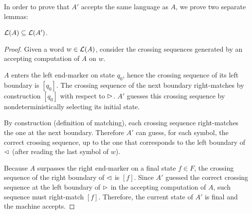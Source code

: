 In order to prove that $A'$ accepts the same language as $A$, we prove two separate lemmas:
\begin{lemm}\label{lem:2DFAto1NFA-1}
	$\mathcal L(A)\subseteq\mathcal L(A')$.
\end{lemm}
\begin{proof}
	Given a word $w\in\mathcal L(A)$, consider the crossing sequences generated by an accepting computation of $A$ on $w$.

	$A$ enters the left end-marker on state $q_0$, hence the crossing sequence of its left boundary is $[q_0]$.
	The crossing sequence of the next boundary right-matches by construction $[q_0]$ with respect to $\rhd$.
	$A'$ guesses this crossing sequence by nondeterministically selecting its initial state.

	By construction (definition of matching), each crossing sequence right-matches the one at the next boundary.
	Therefore $A'$ can guess, for each symbol, the correct crossing sequence, up to the one that corresponds to the left boundary of $\lhd$ (after reading the last symbol of $w$).

	Because $A$ surpasses the right end-marker on a final state $f\in F$, the crossing sequence of the right boundary of $\lhd$ is $[f]$.
	Since $A'$ guessed the correct crossing sequence at the left boundary of $\rhd$ in the accepting computation of $A$, such sequence must right-match $[f]$.
	Therefore, the current state of $A'$ is final and the machine accepts.
\end{proof}


